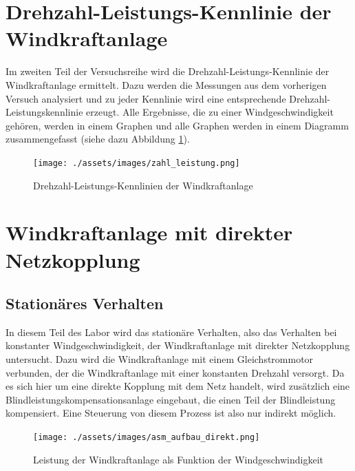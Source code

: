 \documentclass{report}
\begin{document}
\section{Drehzahl-Leistungs-Kennlinie der Windkraftanlage}

Im zweiten Teil der Versuchsreihe wird die Drehzahl-Leistungs-Kennlinie der Windkraftanlage ermittelt. Dazu werden die Messungen aus dem vorherigen Versuch analysiert und zu jeder Kennlinie wird eine entsprechende Drehzahl-Leistungskennlinie erzeugt. Alle Ergebnisse, die zu einer Windgeschwindigkeit gehören, werden in einem Graphen und alle Graphen werden in einem Diagramm zusammengefasst (siehe dazu Abbildung \ref{fig:zahl_leistung}).

\begin{figure}[!ht]
	\centering
	\texttt{[image: ./assets/images/zahl\_leistung.png]}
	\caption{Drehzahl-Leistungs-Kennlinien der Windkraftanlage}
	\label{fig:zahl_leistung}
\end{figure}

\section{Windkraftanlage mit direkter Netzkopplung}

\subsection{Stationäres Verhalten}

In diesem Teil des Labor wird das stationäre Verhalten, also das Verhalten bei konstanter Windgeschwindigkeit, der Windkraftanlage mit direkter Netzkopplung untersucht. Dazu wird die Windkraftanlage mit einem Gleichstrommotor verbunden, der die Windkraftanlage mit einer konstanten Drehzahl versorgt. Da es sich hier um eine direkte Kopplung mit dem Netz handelt, wird zusätzlich eine Blindleistungskompensationsanlage eingebaut, die einen Teil der Blindleistung kompensiert. Eine Steuerung von diesem Prozess ist also nur indirekt möglich.

\begin{figure}[!ht]
	\centering
	\texttt{[image: ./assets/images/asm\_aufbau\_direkt.png]}
	\caption{Leistung der Windkraftanlage als Funktion der Windgeschwindigkeit}
	\label{fig:aufbau_direkt}
\end{figure}
\end{document}
